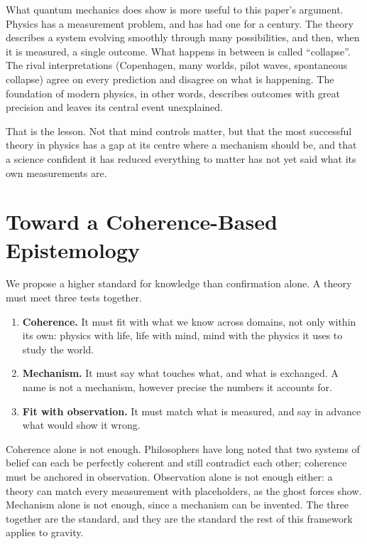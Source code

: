 \documentclass[11pt,a4paper]{article}
\begin{document}
What quantum mechanics does show is more useful to this paper's argument. Physics has a measurement problem, and has had one for a century. The theory describes a system evolving smoothly through many possibilities, and then, when it is measured, a single outcome. What happens in between is called ``collapse''.  The rival interpretations (Copenhagen, many worlds, pilot waves, spontaneous collapse) agree on every prediction and disagree on what is happening. The foundation of modern physics, in other words, describes outcomes with great precision and leaves its central event unexplained.

That is the lesson. Not that mind controls matter, but that the most successful theory in physics has a gap at its centre where a mechanism should be, and that a science confident it has reduced everything to matter has not yet said what its own measurements are.

\section{Toward a Coherence-Based Epistemology}
\label{sec:epistemology}

We propose a higher standard for knowledge than confirmation alone. A theory must meet three tests together.
\begin{enumerate}
    \item \textbf{Coherence.} It must fit with what we know across domains, not only within its own: physics with life, life with mind, mind with the physics it uses to study the world.
    \item \textbf{Mechanism.} It must say what touches what, and what is exchanged. A name is not a mechanism, however precise the numbers it accounts for.
    \item \textbf{Fit with observation.} It must match what is measured, and say in advance what would show it wrong.
\end{enumerate}

Coherence alone is not enough. Philosophers have long noted that two systems of belief can each be perfectly coherent and still contradict each other; coherence must be anchored in observation. Observation alone is not enough either: a theory can match every measurement with placeholders, as the ghost forces show. Mechanism alone is not enough, since a mechanism can be invented. The three together are the standard, and they are the standard the rest of this framework applies to gravity.
\end{document}
